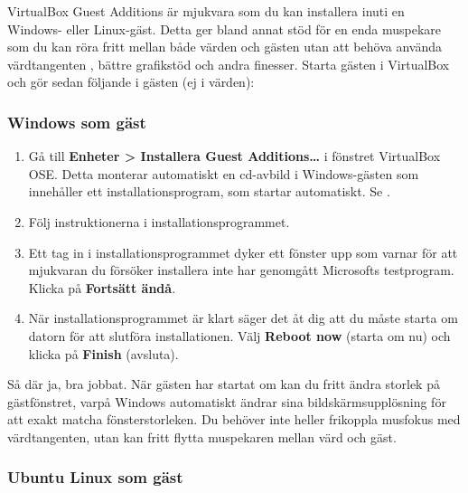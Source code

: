 \documentclass[a4paper,final]{memoir} %
\begin{document}
VirtualBox Guest Additions är mjukvara som du kan installera inuti en Windows- eller Linux-gäst. Detta ger bland annat stöd för en enda muspekare som du kan röra fritt mellan både värden och gästen utan att behöva använda värdtangenten , bättre grafikstöd och andra finesser. Starta gästen i VirtualBox och gör sedan följande i gästen (ej i värden):

\subsubsection{Windows som gäst}

\begin{enumerate}

\item Gå till \textbf{Enheter \textgreater{} Installera Guest Additions\ldots{}} i fönstret VirtualBox OSE. Detta monterar automatiskt en cd-avbild i Windows-gästen som innehåller ett installationsprogram, som startar automatiskt. Se .


\item Följ instruktionerna i installationsprogrammet.

\item Ett tag in i installationsprogrammet dyker ett fönster upp som varnar för att mjukvaran du försöker installera inte har genomgått Microsofts testprogram. Klicka på \textbf{Fortsätt ändå}.

\item När installationsprogrammet är klart säger det åt dig att du måste starta om datorn för att slutföra installationen. Välj \textbf{Reboot now} (starta om nu) och klicka på \textbf{Finish} (avsluta).

\end{enumerate}

Så där ja, bra jobbat. När gästen har startat om kan du fritt ändra storlek på gästfönstret, varpå Windows automatiskt ändrar sina bildskärmsupplösning för att exakt matcha fönsterstorleken. Du behöver inte heller frikoppla musfokus med värdtangenten, utan kan fritt flytta muspekaren mellan värd och gäst.

\subsubsection{Ubuntu Linux som gäst}
\end{document}
